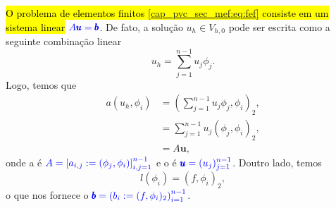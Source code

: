 \hl{O problema de elementos finitos {\eqref{cap_pvc_sec_mef:eq:fef}} consiste em um sistema linear} $\color{blue}A\pmb{u} = \pmb{b}$. De fato, a solução $u_h\in V_{h,0}$ pode ser escrita como a seguinte combinação linear
\begin{equation}
  u_h = \sum_{j=1}^{n-1}u_j\phi_j.
\end{equation}
Logo, temos que
\begin{subequations}
  \begin{align}
    a(u_h, \phi_i) &= \left(\sum_{j=1}^{n-1}u_j\phi_j, \phi_i\right)_2,\\
                   &= \sum_{j=1}^{n-1}u_j(\phi_j,\phi_i)_2,\\
                   &= A\pmb{u},
  \end{align}
\end{subequations}
onde a  é $\color{blue}A = \left[a_{i,j}:=(\phi_j, \phi_i)\right]_{i,j=1}^{n-1}$ e o  é $\color{blue}\pmb{u} = (u_j)_{j=1}^{n-1}$. Doutro lado, temos
\begin{equation}
  l(\phi_i) = (f, \phi_i)_2,
\end{equation}
o que nos fornece o  $\color{blue}\pmb{b} = \left(b_i:=(f, \phi_i)_2\right)_{i=1}^{n-1}$.

